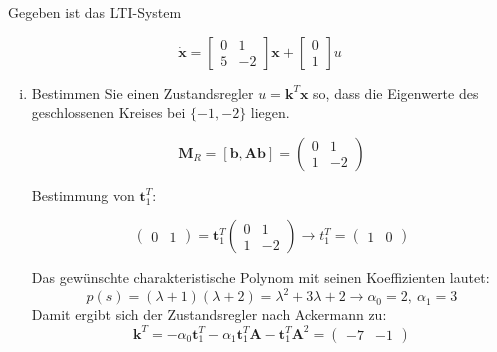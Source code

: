 \documentclass[crop=false]{standalone}
\begin{document}
\begin{task}
Gegeben ist das LTI-System

\[ 
\dot{\mathbf{x}}=\left[\begin{array}{cc}{0} & {1} \\ {5} & {-2}\end{array}\right] \mathbf{x}+\left[\begin{array}{l}{0} \\ {1}\end{array}\right] u
 \]
 
 \begin{enumerate}[i.]
  \item Bestimmen Sie einen Zustandsregler $u=\mathbf{k}^{T} \mathbf{x}$ so, dass die Eigenwerte des geschlossenen Kreises bei $\{-1,-2\}$ liegen.
\begin{solution}
\[\mathbf{M}_R = \left[\mathbf{b}, \mathbf{Ab} \right] = \begin{pmatrix} 0 & 1\\ 1 & -2 \end{pmatrix}\]

Bestimmung von $\mathbf{t}_1^T$:

\[ \begin{pmatrix} 0 & 1 \end{pmatrix} = \mathbf{t}_1^T \begin{pmatrix} 0 & 1\\ 1 & -2 \end{pmatrix} \rightarrow t_1^T = \begin{pmatrix} 1 & 0 \end{pmatrix}\]

Das gewünschte charakteristische Polynom mit seinen Koeffizienten lautet:
\[ p(s) = (\lambda + 1)(\lambda + 2) = \lambda^2 + 3 \lambda + 2 \rightarrow \alpha_0 = 2, \ \alpha_1 = 3\]
Damit ergibt sich der Zustandsregler nach Ackermann zu:
\[ \mathbf{k}^T = -\alpha_0 \mathbf{t}_1^T - \alpha_1 \mathbf{t}_1^T \mathbf{A} - \mathbf{t}_1^T \mathbf{A}^2 = \begin{pmatrix} -7 & -1 \end{pmatrix}\]


\end{solution}
\end{enumerate}
\end{task}
\end{document}
